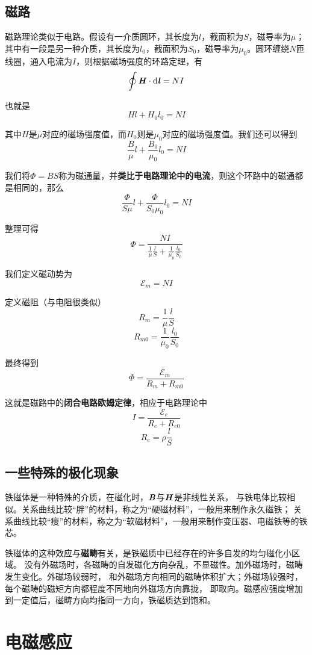 \documentclass[UTF8,openany]{book}
\begin{document}
	\section{磁路}
	\par 磁路理论类似于电路。假设有一介质圆环，其长度为$l$，截面积为$S$，磁导率为$\mu$；其中有一段是另一种介质，其长度为$l_0$，截面积为$S_0$，磁导率为$\mu_0$。圆环缠绕$N$匝线圈，通入电流为$I$，则根据磁场强度的环路定理，有
	$$\oint\textbf{\textit{H}}\cdot\mathrm{d}\textbf{\textit{l}}=NI$$
	\par 也就是
	$$Hl+H_0l_0=NI$$
	\par 其中$H$是$\mu$对应的磁场强度值，而$H_0$则是$\mu_0$对应的磁场强度值。我们还可以得到
	$$\frac{B}{\mu}l+\frac{B_0}{\mu_0}l_0=NI$$
	\par 我们将$\Phi=BS$称为磁通量，并\textbf{类比于电路理论中的电流}，则这个环路中的磁通都是相同的，那么
	$$\frac{\Phi}{S\mu}l+\frac{\Phi}{S_0\mu_0}l_0=NI$$
	\par 整理可得
	$$\Phi=\frac{NI}{\frac{1}{\mu}\frac{l}{S}+\frac{1}{\mu_0}\frac{l_0}{S_0}}$$
	\par 我们定义磁动势为
	$$\mathcal{E}_m=NI$$
	\par 定义磁阻（与电阻很类似）
	$$R_m=\frac{1}{\mu}\frac{l}{S}$$
	$$R_{m0}=\frac{1}{\mu_0}\frac{l_0}{S_0}$$
	\par 最终得到
	$$\Phi=\frac{\mathcal{E}_m}{R_m+R_{m0}}$$
	\par 这就是磁路中的\textbf{闭合电路欧姆定律}，相应于电路理论中
	$$I=\frac{\mathcal{E}_e}{R_e+R_{e0}}$$
	$$R_e=\rho\frac{l}{S}$$
	\section{一些特殊的极化现象}
	\par 铁磁体是一种特殊的介质，在磁化时，$\textbf{\textit{B}}$与$\textbf{\textit{H}}$是非线性关系，
	与铁电体比较相似。关系曲线比较“胖”的材料，称之为“硬磁材料”，一般用来制作永久磁铁；
	关系曲线比较“瘦”的材料，称之为“软磁材料”，一般用来制作变压器、电磁铁等的铁芯。
	\par 铁磁体的这种效应与\textbf{磁畴}有关，是铁磁质中已经存在的许多自发的均匀磁化小区域。
	没有外磁场时，各磁畴的自发磁化方向杂乱，不显磁性。加外磁场时，磁畴发生变化。外磁场较弱时，
	和外磁场方向相同的磁畴体积扩大；外磁场较强时，每个磁畴的磁矩方向都程度不同地向外磁场方向靠拢，
	即取向。磁感应强度增加到一定值后，磁畴方向均指同一方向，铁磁质达到饱和。
	
	\chapter{电磁感应}
\end{document}
